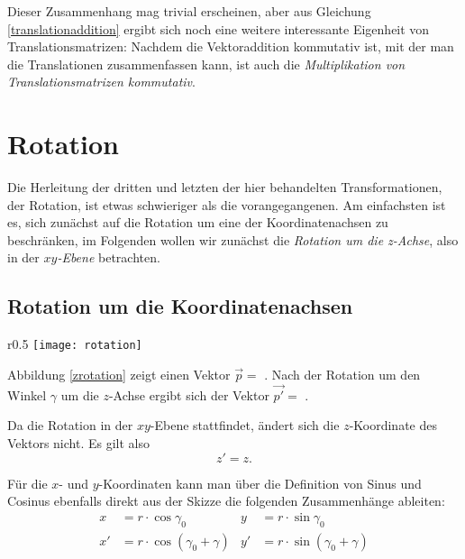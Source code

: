 Dieser Zusammenhang mag trivial erscheinen, aber aus Gleichung \ref{translationaddition} ergibt sich noch eine weitere interessante Eigenheit von Translationsmatrizen: Nachdem die Vektoraddition kommutativ ist, mit der man die Translationen zusammenfassen kann, ist auch die \emph{Multiplikation von Translationsmatrizen kommutativ}.

\section{Rotation}
Die Herleitung der dritten und letzten der hier behandelten Transformationen, der Rotation, ist etwas schwieriger als die vorangegangenen. Am einfachsten ist es, sich zunächst auf die Rotation um eine der Koordinatenachsen zu beschränken, im Folgenden wollen wir zunächst die \emph{Rotation um die z-Achse}, also in der \emph{$xy$-Ebene} betrachten.

\subsection{Rotation um die Koordinatenachsen}

\begin{wrapfigure}{r}{0.5\textwidth}
  \vspace{-15pt}
  \texttt{[image: rotation]}
  \vspace{-15pt}
  \caption{Rotation um die $z$-Achse.}
  \label{zrotation}
\end{wrapfigure}

Abbildung \ref{zrotation} zeigt einen Vektor $\vec p = $ . Nach der Rotation um den Winkel $\gamma$ um die $z$-Achse ergibt sich der Vektor $\vec{p'} = $ .

Da die Rotation in der $xy$-Ebene stattfindet, ändert sich die $z$-Koordinate des Vektors nicht. Es gilt also
\begin{equation}
 z' = z.
\end{equation}

Für die $x$- und $y$-Koordinaten kann man über die Definition von Sinus und Cosinus ebenfalls direkt aus der Skizze die folgenden Zusammenhänge ableiten:
\begin{align}
  x &= r \cdot \cos{\gamma_0}            &   y &= r \cdot \sin{\gamma_0} \label{rot1} \\
 x' &= r \cdot \cos{(\gamma_0 + \gamma)} &  y' &= r \cdot \sin{(\gamma_0 + \gamma)} \label{rot2}
\end{align}

